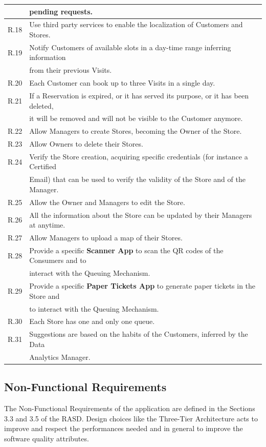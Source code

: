 \documentclass[a4paper, 12pt, oneside, table]{article}
\begin{document}
\begin{tabularx}{\linewidth}{| o || l |}
	& pending requests.\\
	\hline
	R.18 & Use third party services to enable the localization of Customers and Stores. \\
	\hline
	R.19 & Notify Customers of available slots in a day-time range inferring information\\
	& from their previous Visits.\\
	\hline
	R.20 & Each Customer can book up to three Visits in a single day.\\
	\hline
	R.21 & If a Reservation is expired, or it has served its purpose, or it has been deleted,\\
	& it will be removed and will not be visible to the Customer anymore.\\
	\hline
	R.22 & Allow Managers to create Stores, becoming the Owner of the Store.\\
	\hline
	R.23 & Allow Owners to delete their Stores.\\
	\hline
	R.24 & Verify the Store creation, acquiring specific credentials (for instance a Certified\\
	& Email) that can be used to verify the validity of the Store and of the Manager.\\
	\hline
	R.25 & Allow the Owner and Managers to edit the Store.\\
	\hline
	R.26 & All the information about the Store can be updated by their Managers at anytime.\\
	\hline
	R.27 & Allow Managers to upload a map of their Stores.\\
	\hline
	R.28 & Provide a specific \textbf{Scanner App} to scan the QR codes of the Consumers and to\\
	& interact with the Queuing Mechanism.\\
	\hline
	R.29 & Provide a specific \textbf{Paper Tickets App} to generate paper tickets in the Store and\\
	& to interact with the Queuing Mechanism.\\
	\hline
	R.30 & Each Store has one and only one queue.\\
	\hline
	R.31 & Suggestions are based on the habits of the Customers, inferred by the Data\\
	& Analytics Manager.\\
	\hline
    
\end{tabularx}

\subsection{Non-Functional Requirements}
The Non-Functional Requirements of the application are defined in the Sections 3.3 and 3.5 of the RASD. Design choices like the Three-Tier Architecture acts to improve and respect the performances needed and in general to improve the software quality attributes.
\end{document}
